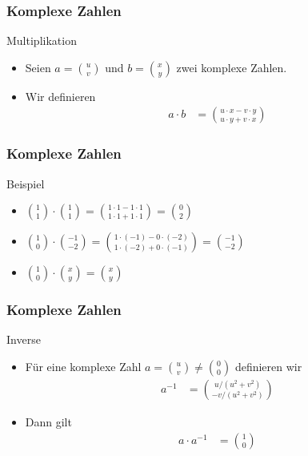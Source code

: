 \documentclass{beamer}
\newcommand\bc[1]{\left({#1}\right)}
\newcommand{\ue}{\"u}
\newcommand{\mytitle}{Komplexe Zahlen}
\begin{document}
\begin{frame}\frametitle{\mytitle}
	\begin{block}{Multiplikation}
		\begin{itemize}
				\item Seien $a=\binom uv$ und $b=\binom xy$ zwei komplexe Zahlen.
				\item Wir definieren
					\begin{align*}
						a\cdot b&=\binom{u\cdot x-v\cdot y}{u\cdot y+v\cdot x}
					\end{align*}
		\end{itemize}	
	\end{block}
\end{frame}

\begin{frame}\frametitle{\mytitle}
	\begin{block}{Beispiel}
		\begin{itemize}
			\item $\binom11\cdot\binom11=\binom{1\cdot1-1\cdot1}{1\cdot1+1\cdot1}=\binom02$	
			\item $\binom10\cdot\binom{-1}{-2}=\binom{1\cdot(-1)-0\cdot(-2)}{1\cdot(-2)+0\cdot(-1)}=\binom{-1}{-2}$
			\item $\binom10\cdot\binom{x}{y}=\binom xy$
		\end{itemize}	
	\end{block}
\end{frame}

\begin{frame}\frametitle{\mytitle}
	\begin{block}{Inverse}
		\begin{itemize}
			\item F\ue r eine komplexe Zahl $a=\binom uv\neq\binom00$ definieren wir
				\begin{align*}
					a^{-1}&=\binom{u/\bc{u^2+v^2}}{-v/\bc{u^2+v^2}}
				\end{align*}
			\item Dann gilt
				\begin{align*}
					a\cdot a^{-1}&=\binom10
				\end{align*}
		\end{itemize}	
	\end{block}
\end{frame}
\end{document}
